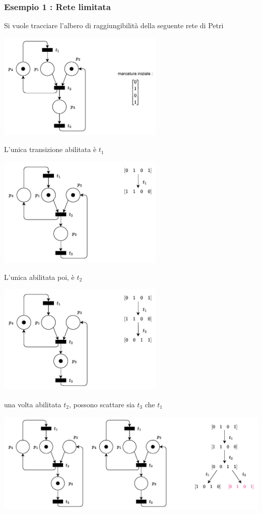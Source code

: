 \documentclass[10pt, letterpaper]{report}
\begin{document}
\subsubsection{Esempio 1 : Rete limitata}
Si vuole tracciare l'albero di raggiungibilità della seguente rete di Petri
\begin{center}
    \includegraphics[width=0.6\textwidth]{images/alberoRag1.drawio.pdf}
\end{center}
L'unica transizione abilitata è $t_1$
\begin{center}
    \includegraphics[width=0.6\textwidth]{images/alberoRag2.drawio.pdf}
\end{center}
L'unica abilitata poi, è $t_2$
\begin{center}
    \includegraphics[width=0.6\textwidth]{images/alberoRag3.drawio.pdf}
\end{center}
una volta abilitata $t_2$, possono scattare sia $t_3$ che $t_1$
\begin{center}
    \includegraphics[width=\textwidth]{images/alberoRag4.drawio.pdf}
\end{center}
\end{document}
